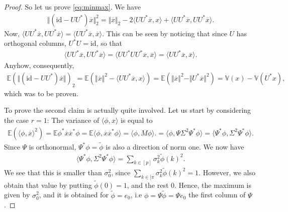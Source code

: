 \documentclass{article}
\newcommand{\erw}{\mathbb{E}} %
\newcommand{\id}{\mathrm{id}}
\newcommand{\sprod}[1]{\langle #1 \rangle}
\newcommand{\norm}[1]{\Vert #1 \Vert}
\begin{document}
\begin{proof}
So let us prove \ref{eq:minmax}.  We have
\begin{align*}
    \norm{(\id-UU^*)\overline{x}}_2^2 = \norm{\overline{x}}_2-2\sprod{UU^*\overline{x},x} + \sprod{UU^*\overline{x},UU^*\overline{x}}.
\end{align*}
Now, $\sprod{UU^*\overline{x},UU^*\overline{x}} = \sprod{UU^*\overline{x},\overline{x}}$. This can be seen by noticing that since $U$ has orthogonal columns, $U^*U=\id$, so that
\begin{align*}
\sprod{UU^*\overline{x},UU^*\overline{x}} = \sprod{UU^*UU^*\overline{x},\overline{x}} = \sprod{UU^*\overline{x},\overline{x}}.
\end{align*}
Anyhow, consequently,
\begin{align*}
    \erw(\norm{(\id-UU^*)\overline{x}})_2 = \erw(\norm{\overline{x}}^2 - \sprod{UU^*\overline{x},x})  = \erw(\norm{\overline{x}}^2- \norm{U^*\overline{x}}^2) = \mathbb{V}(x) - \mathbb{V}(U^*x),
\end{align*}
which was to be proven.

To prove the second claim is actually quite involved. Let us start by considering the case $r=1$: The variance of $\sprod{\phi,x}$ is equal to 
\begin{align*}
    \erw(\sprod{\phi, \overline{x}}^2) = \erw{\phi^*\overline{x}\overline{x}^*\phi} = \erw{\sprod{\phi,\overline{x}\overline{x}^*\phi}} = \sprod{\phi, M \phi}. = \sprod{\phi,\Psi\Sigma^2\Psi^*\phi} = \sprod{\Psi^*\phi,\Sigma^2\Psi^*\phi}.
\end{align*}
Since $\Psi$ is orthonormal, $\Psi^*\phi=\tilde{\phi}$  is also a direction of norm one. We now have
\begin{align*}
    \sprod{\Psi^*\phi,\Sigma^2\Psi^*\phi} = \sum_{k\in [p]} \sigma_k^2\tilde{\phi}(k)^2.
\end{align*}
We see that this is smaller than $\sigma_0^2$, since $\sum_{k\in [\pi} \sigma_k^2\tilde{\phi}(k)^2=1$. However, we also obtain that value by putting $\tilde{\phi}(0)=1$, and the rest $0$. Hence, the maximum is given by $\sigma_0^2$, and it is obtained for $\tilde{\phi}=e_0$, i.e $\phi = \Psi \tilde{\phi} = \Psi e_0$ the first column of $\Psi$.


\end{proof}
\end{document}
